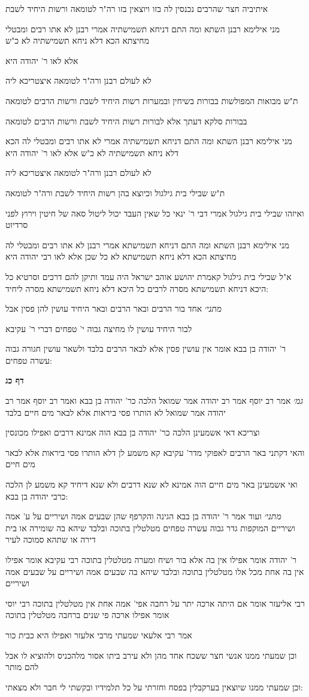 \documentclass[12pt, openany]{book}
\newcommand{\sethebfont}{
\fontsize{10.5pt}{21.0pt} \selectfont
}
\newcommand{\textblock}[1]{
{\sethebfont #1\\}	
}
\newcommand{\sectname}{}
\newcommand{\newsection}[1]{
	\addcontentsline{toc}{section}{#1}
	\renewcommand{\sectname}{#1}	
	\vspace{-\baselineskip}
	\begin{center}
		\textbf{%
\fontsize{16pt}{16pt}\selectfont
			#1}
	\end{center}
	\vspace{-\baselineskip}
	\nopagebreak
}
\begin{document}
\textblock{איתיביה חצר שהרבים נכנסין לה בזו ויוצאין בזו רה"ר לטומאה ורשות היחיד לשבת}
\textblock{מני אילימא רבנן השתא ומה התם דניחא תשמישתיה אמרי רבנן לא אתו רבים ומבטלי מחיצתא הכא דלא ניחא תשמישתיה לא כ"ש}
\textblock{אלא לאו ר' יהודה היא}
\textblock{לא לעולם רבנן ורה"ר לטומאה איצטריכא ליה}
\textblock{ת"ש מבואות המפולשות בבורות בשיחין ובמערות רשות היחיד לשבת ורשות הרבים לטומאה}
\textblock{בבורות סלקא דעתך אלא לבורות רשות היחיד לשבת ורשות הרבים לטומאה}
\textblock{מני אילימא רבנן השתא ומה התם דניחא תשמישתיה אמרי לא אתו רבים ומבטלי לה הכא דלא ניחא תשמישתיה לא כ"ש אלא לאו ר' יהודה היא}
\textblock{לא לעולם רבנן ורה"ר לטומאה איצטריכא ליה}
\textblock{ת"ש שבילי בית גילגול וכיוצא בהן רשות היחיד לשבת ורה"ר לטומאה}
\textblock{ואיזהו שבילי בית גילגול אמרי דבי ר' ינאי כל שאין העבד יכול ליטול סאה של חיטין וירוץ לפני סרדיוט}
\textblock{מני אילימא רבנן השתא ומה התם דניחא תשמישתא אמרי רבנן לא אתו רבים ומבטלי לה מחיצתא הכא דלא ניחא תשמישתא לא כל שכן אלא לאו רבי יהודה היא}
\textblock{א"ל שבילי בית גילגול קאמרת יהושע אוהב ישראל היה עמד ותיקן להם דרכים וסרטיא כל היכא דניחא תשמישתא מסרה לרבים כל היכא דלא ניחא תשמישתא מסרה ליחיד:}
\textblock{{\large\emph{מתני׳}} אחד בור הרבים ובאר הרבים ובאר היחיד עושין להן פסין אבל}
\textblock{לבור היחיד עושין לו מחיצה גבוה י' טפחים דברי ר' עקיבא}
\textblock{ר' יהודה בן בבא אומר אין עושין פסין אלא לבאר הרבים בלבד ולשאר עושין חגורה גבוה עשרה טפחים:}
\newsection{דף כג}
\textblock{{\large\emph{גמ׳}} אמר רב יוסף אמר רב יהודה אמר שמואל הלכה כר' יהודה בן בבא ואמר רב יוסף אמר רב יהודה אמר שמואל לא הותרו פסי ביראות אלא לבאר מים חיים בלבד}
\textblock{וצריכא דאי אשמעינן הלכה כר' יהודה בן בבא הוה אמינא דרבים ואפילו מכונסין}
\textblock{והאי דקתני באר הרבים לאפוקי מדר' עקיבא קא משמע לן דלא הותרו פסי ביראות אלא לבאר מים חיים}
\textblock{ואי אשמעינן באר מים חיים הוה אמינא לא שנא דרבים ולא שנא דיחיד קא משמע לן הלכה כרבי יהודה בן בבא:}
\textblock{{\large\emph{מתני׳}} ועוד אמר ר' יהודה בן בבא הגינה והקרפף שהן שבעים אמה ושיריים על ע' אמה ושיריים המוקפות גדר גבוה עשרה טפחים מטלטלין בתוכה ובלבד שיהא בה שומירה או בית דירה או שתהא סמוכה לעיר}
\textblock{ר' יהודה אומר אפילו אין בה אלא בור ושיח ומערה מטלטלין בתוכה רבי עקיבא אומר אפילו אין בה אחת מכל אלו מטלטלין בתוכה ובלבד שיהא בה שבעים אמה ושיריים על שבעים אמה ושיריים}
\textblock{רבי אליעזר אומר אם היתה ארכה יתר על רחבה אפי' אמה אחת אין מטלטלין בתוכה רבי יוסי אומר אפילו ארכה פי שנים ברחבה מטלטלין בתוכה}
\textblock{אמר רבי אלעאי שמעתי מרבי אלעזר ואפילו היא כבית כור}
\textblock{וכן שמעתי ממנו אנשי חצר ששכח אחד מהן ולא עירב ביתו אסור מלהכניס ולהוציא לו אבל להם מותר}
\textblock{וכן שמעתי ממנו שיוצאין בערקבלין בפסח וחזרתי על כל תלמידיו ובקשתי לי חבר ולא מצאתי:}
\end{document}
